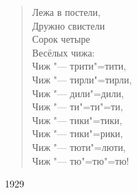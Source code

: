 \begin{verse}               Лежа в постели, \\
               Дружно свистели \\
               Сорок четыре \\
               Весёлых чижа: \\
               Чиж "--- трити"=тити, \\
               Чиж "--- тирли"=тирли, \\
               Чиж "--- дили"=дили, \\
               Чиж "--- ти"=ти"=ти, \\
               Чиж "--- тики"=тики, \\
               Чиж "--- тики"=рики, \\
               Чиж "--- тюти"=люти, \\
               Чиж "--- тю"=тю"=тю! \\\end{verse}

\begin{flushright}               1929 \end{flushright}

